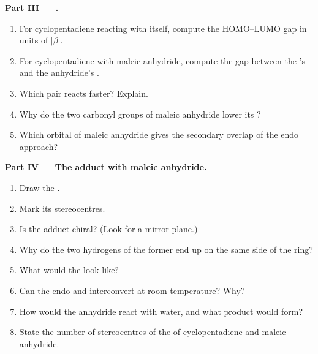 \begin{problem}
\medskip
\noindent\textbf{Part III --- .}
\begin{enumerate}[resume]
  \item For cyclopentadiene reacting with itself, compute the HOMO--LUMO gap in units of
        $|\beta|$.
  \item For cyclopentadiene with maleic anhydride, compute the gap between the 's
         and the anhydride's .
  \item Which pair reacts faster? Explain.
  \item Why do the two carbonyl groups of maleic anhydride lower its ?
  \item Which orbital of maleic anhydride gives the secondary overlap of the endo
        approach?
\end{enumerate}

\medskip
\noindent\textbf{Part IV --- The adduct with maleic anhydride.}
\begin{enumerate}[resume]
  \item Draw the .
  \item Mark its stereocentres.
  \item Is the adduct chiral? (Look for a mirror plane.)
  \item Why do the two hydrogens of the former  end up on the same side of the
        ring?
  \item What would the  look like?
  \item Can the endo and  interconvert at room temperature? Why?
  \item How would the anhydride react with water, and what product would form?
  \item State the number of stereocentres of the  of cyclopentadiene and
        maleic anhydride.
\end{enumerate}
\end{problem}
